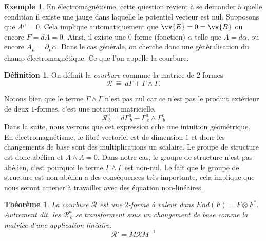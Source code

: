 \documentclass[a4paper,11pt]{report}
\theoremstyle{definition}
\theoremstyle{plain}
\newtheorem{thm}{Théorème}[chapter]
\theoremstyle{definition}
\newtheorem{defn}{Définition}[chapter]
\newtheorem{exmp}{Exemple}[chapter]
\theoremstyle{remark}
\newcommand{\p}{\partial}
\begin{document}
                \begin{exmp}
                    En électromagnétisme, cette question revient à se demander à quelle condition il existe une jauge dans laquelle le potentiel vecteur est nul. Supposons que $A^\mu = 0$. Cela implique automatiquement que $\vv{E} = 0 = \vv{B}$ ou encore $F = dA = 0$. Ainsi, il existe une $0$-forme (fonction) $\alpha$ telle que $A = d\alpha$, ou encore $A_\mu = \p_\mu\alpha$. Dans le cas générale, on cherche donc une généralisation du champ électromagnétique. Ce que l'on appelle la courbure.
                \end{exmp}
                
                \begin{defn}
                    On définit la \textit{courbure} commme la matrice de $2$-formes
                    \begin{equation}
                        \mathscr{R}~\hat{=}~d\Gamma + \Gamma\wedge\Gamma.
                    \end{equation}
                \end{defn}
                Notons bien que le terme $\Gamma\wedge\Gamma$ n'est pas nul car ce n'est pas le produit extérieur de deux $1$-formes, c'est une notation matricielle.
                \begin{equation}
                    \mathscr{R}^a_{~b} = d\Gamma^a_{~b} + \Gamma^a_{~c}\wedge\Gamma^c_{~b}
                \end{equation}
                Dans la suite, nous verrons que cet expression cche une intuition géométrique.\\
                
                En électromagnétisme, le fibré vectoriel est de dimension $1$ et donc les changements de base sont des multiplications un scalaire. Le groupe de structure est donc abélien et $A\wedge A = 0$. Dans notre cas, le groupe de structure n'est pas abélien, c'est pourquoi le terme $\Gamma\wedge\Gamma$ est non-nul. Le fait que le groupe de structure est non-abélien a des conséquences très importante, cela implique que nous seront amener à travailler avec des équation non-linéaires.
                
                \begin{thm}
                    La courbure $\mathscr{R}$ est une $2$-forme à  valeur dans $End(F)= F\otimes F^*$. Autrement dit, les $\mathscr{R}^a_{~b}$ se transforment sous un changement de base comme la matrice d'une application linéaire.
                    \begin{equation}
                        \mathscr{R}' = M\mathscr{R}M^{-1}
                    \end{equation}
                \end{thm}
                
\end{document}
